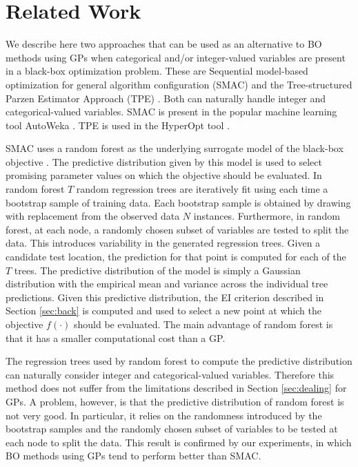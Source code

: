 \section{Related Work} \label{sec:related}

We describe here two approaches that can be used as an 
alternative to BO methods using GPs when categorical and/or
integer-valued variables are present in a black-box optimization problem. These 
are Sequential model-based optimization for general algorithm configuration (SMAC) 
\citep{hutter2011sequential} and the Tree-structured Parzen Estimator Approach (TPE) 
\citep{bergstra2011algorithms}. Both can naturally handle integer and categorical-valued 
variables. SMAC is present in the popular machine learning tool AutoWeka \citep{thornton2013auto}. 
TPE is used in the HyperOpt tool \citep{bergstra2013hyperopt}.  

SMAC uses a random forest as the underlying surrogate model of the black-box 
objective \citep{breiman2001random}. The predictive distribution given by 
this model is used to select promising parameter values on which the objective should 
be evaluated. In random forest $T$ random regression trees are iteratively fit using 
each time a bootstrap sample of training data. Each bootstrap sample is obtained by drawing 
with replacement from the observed data $N$ instances. Furthermore, in random forest, at each node, 
a randomly chosen subset of variables are tested to split the data. This introduces variability in 
the generated regression trees. Given a candidate test location, the prediction for 
that point is computed for each of the $T$ trees. The predictive distribution of the model
is simply a Gaussian distribution with the empirical mean and variance across the individual
tree predictions. Given this predictive distribution, the EI criterion described in Section 
\ref{sec:back} is computed and used to select a new point at which the objective $f(\cdot)$ should 
be evaluated. The main advantage of random forest is that it has a smaller computational cost than
a GP. 

The regression trees used by random forest to compute the predictive 
distribution can naturally consider integer and categorical-valued variables.
Therefore this method does not suffer from the limitations described in Section \ref{sec:dealing}
for GPs. A problem, however, is that the predictive distribution of random forest is not 
very good. In particular, it relies on the randomness introduced by the bootstrap samples 
and the randomly chosen subset of variables to be tested at each node to split the data. 
This result is confirmed by our experiments, in which BO methods using GPs tend to 
perform better than SMAC.

